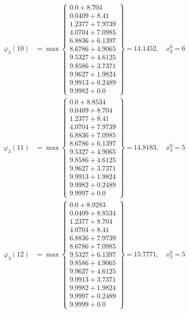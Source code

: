 \documentclass{article}
\begin{document}
\begin{align*}
  
  
  
\varphi_{3}(10) &= \max \left\{ \begin{array}{c}
0.0 + 8.704 \\
 0.0409 + 8.41 \\
 1.2377 + 7.9739 \\
 4.0704 + 7.0985 \\
 6.8836 + 6.1397 \\
 8.6786 + 4.9065 \\
 9.5327 + 4.6125 \\
 9.8586 + 3.7371 \\
 9.9627 + 1.9824 \\
 9.9913 + 0.2489 \\
 9.9982 + 0.0
\end{array} \right\}=14.1452,\quad x_{3}^0=6\\
  
  
  
  
\varphi_{3}(11) &= \max \left\{ \begin{array}{c}
0.0 + 8.8534 \\
 0.0409 + 8.704 \\
 1.2377 + 8.41 \\
 4.0704 + 7.9739 \\
 6.8836 + 7.0985 \\
 8.6786 + 6.1397 \\
 9.5327 + 4.9065 \\
 9.8586 + 4.6125 \\
 9.9627 + 3.7371 \\
 9.9913 + 1.9824 \\
 9.9982 + 0.2489 \\
 9.9997 + 0.0
\end{array} \right\}=14.8183,\quad x_{3}^0=5\\
  
  
  
  
\varphi_{3}(12) &= \max \left\{ \begin{array}{c}
0.0 + 8.9283 \\
 0.0409 + 8.8534 \\
 1.2377 + 8.704 \\
 4.0704 + 8.41 \\
 6.8836 + 7.9739 \\
 8.6786 + 7.0985 \\
 9.5327 + 6.1397 \\
 9.8586 + 4.9065 \\
 9.9627 + 4.6125 \\
 9.9913 + 3.7371 \\
 9.9982 + 1.9824 \\
 9.9997 + 0.2489 \\
 9.9999 + 0.0
\end{array} \right\}=15.7771,\quad x_{3}^0=5\\
  

\end{align*}
\end{document}
